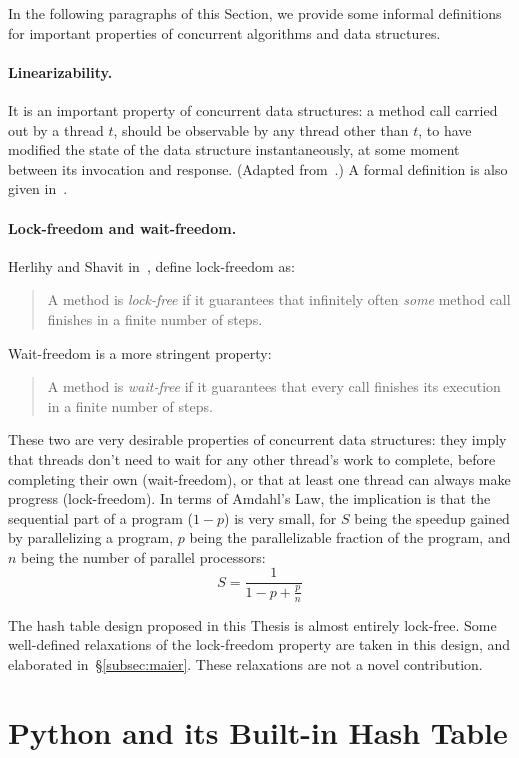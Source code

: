 In the following paragraphs of this Section, we provide some informal definitions for important properties of concurrent algorithms and data structures.

\paragraph{Linearizability.}
It is an important property of concurrent data structures: a method call carried out by a thread $t$, should be observable by any thread other than $t$, to have modified the state of the data structure instantaneously, at some moment between its invocation and response.
(Adapted from~\cite[\S3.5]{art-mp}.)
A formal definition is also given in~\cite[Definition~3.6.1]{art-mp}.

\paragraph{Lock-freedom and wait-freedom.}
Herlihy and Shavit in~\cite[\S3.7]{art-mp}, define lock-freedom as:
\begin{quote}
    A method is \emph{lock-free} if it guarantees that infinitely often \emph{some} method call finishes in a finite number of steps.
\end{quote}
Wait-freedom is a more stringent property:
\begin{quote}
    A method is \emph{wait-free} if it guarantees that every call finishes its execution in a finite number of steps.
\end{quote}

These two are very desirable properties of concurrent data structures: they imply that threads don't need to wait for any other thread's work to complete, before completing their own (wait-freedom), or that at least one thread can always make progress (lock-freedom).
In terms of Amdahl's Law, the implication is that the sequential part of a program ($1 - p$) is very small, for $S$ being the speedup gained by parallelizing a program, $p$ being the parallelizable fraction of the program, and $n$ being the number of parallel processors:
\[
    S = \frac{1}{1 - p + \frac{p}{n}}
\]

The hash table design proposed in this Thesis is almost entirely lock-free.
Some well-defined relaxations of the lock-freedom property are taken in this design, and elaborated in~\S\ref{subsec:maier}.
These relaxations are not a novel contribution.


\section{Python and its Built-in Hash Table}\label{sec:dict-intro}

